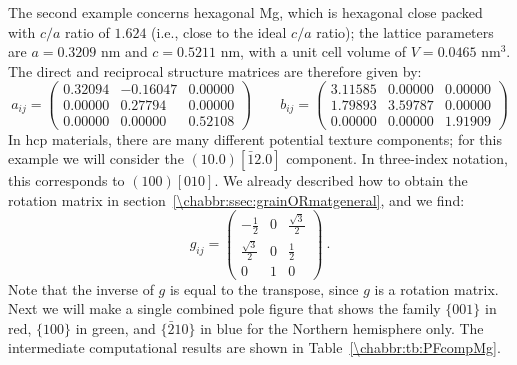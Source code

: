 The second example concerns hexagonal Mg, which is hexagonal close packed with $c/a$ ratio of $1.624$ (i.e., close to the ideal $c/a$ ratio); the lattice parameters are $a=0.3209$ nm and $c=0.5211$ nm, with a unit cell volume of $V=0.0465$ nm$^3$.  The direct and reciprocal structure matrices are therefore given by:
\[
a_{ij}= \begin{pmatrix} 0.32094&      -0.16047&        0.00000\\
   0.00000&       0.27794&        0.00000\\
   0.00000&        0.00000&       0.52108\end{pmatrix}\qquad
   b_{ij}=\begin{pmatrix}
   3.11585&        0.00000&        0.00000\\     
   1.79893&        3.59787&        0.00000\\     
   0.00000&        0.00000&       1.91909
   \end{pmatrix}
\]
In hcp materials, there are many different potential texture components; for this example we will consider the $(10.0)[\bar{1}2.0]$ component. In three-index notation, this corresponds to $(100)[010]$.  We already described how to obtain the rotation matrix in section~\ref{\chabbr:ssec:grainORmatgeneral}, and we find:
\[
	g_{ij} = \begin{pmatrix}
	-\frac{1}{2} & 0 & \frac{\sqrt{3}}{2}\\
	\frac{\sqrt{3}}{2} & 0 & \frac{1}{2}\\
	0 & 1 & 0
	\end{pmatrix}\ .
\]
Note that the inverse of $g$ is equal to the transpose, since $g$ is a rotation matrix.  Next we will make a single combined pole figure that shows the family $\{001\}$ in red, $\{100\}$ in green, and $\{\bar{2}10\}$ in blue for the Northern hemisphere only.  The intermediate computational results are shown in Table~\ref{\chabbr:tb:PFcompMg}. 


